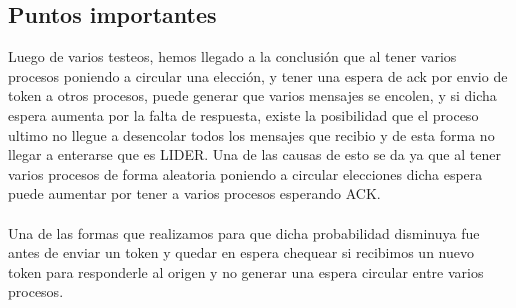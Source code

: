 
\subsection{Puntos importantes}

Luego de varios testeos, hemos llegado a la conclusión que al tener varios procesos poniendo a circular una elección, y tener una espera de ack por envio de token a otros procesos, puede generar que varios mensajes se encolen, y si dicha espera aumenta por la falta de respuesta, existe la posibilidad que el proceso ultimo no llegue a desencolar todos los mensajes que recibio y de esta forma no llegar a enterarse que es LIDER. Una de las causas de esto se da ya que al  tener varios procesos de forma aleatoria poniendo a circular elecciones dicha espera puede aumentar por tener a varios procesos esperando ACK.\\\\

Una de las formas que realizamos para que dicha probabilidad disminuya fue antes de enviar un token y quedar en espera chequear si recibimos un nuevo token para responderle al origen y no generar una espera circular entre varios procesos.\\




